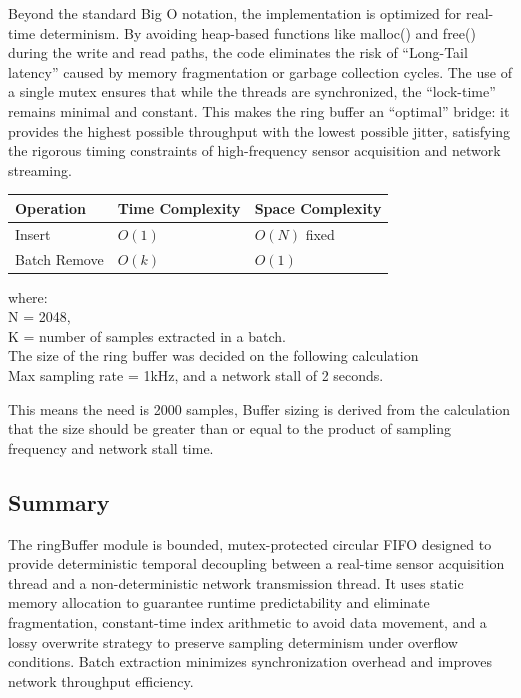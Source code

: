 Beyond the standard Big O notation, the implementation is optimized for real-time determinism. By avoiding heap-based functions like malloc() and free() during the write and read paths, the code eliminates the risk of “Long-Tail latency” caused by memory fragmentation or garbage collection cycles. The use of a single mutex ensures that while the threads are synchronized, the “lock-time” remains minimal and constant. This makes the ring buffer an “optimal” bridge: it provides the highest possible throughput with the lowest possible jitter, satisfying the rigorous timing constraints of high-frequency sensor acquisition and network streaming.

\begin{table}[H]
    \centering 
        \begin{tabular}{lll}
        \toprule
		\textbf{Operation} & \textbf{Time Complexity} & \textbf{Space Complexity} \\
		\midrule 
		Insert & $O(1)$ & $O(N)$ fixed \\
		Batch Remove &  $O(k)$ & $O(1)$ \\
        \bottomrule
    \end{tabular}
\end{table}

where: \\
N = 2048, \\
K = number of samples extracted in a batch. \\

The size of the ring buffer was decided on the following calculation\\
Max sampling rate = 1kHz, and a network stall of 2 seconds. 


This means the need is 2000 samples, Buffer sizing is derived from the calculation that the size should be greater than or equal to the product of sampling frequency and network stall time.


\subsection{Summary}
The ringBuffer module is bounded, mutex-protected circular FIFO designed to provide deterministic temporal decoupling between a real-time sensor acquisition thread and a non-deterministic network transmission thread. It uses static memory allocation to guarantee runtime predictability and eliminate fragmentation, constant-time index arithmetic to avoid data movement, and a lossy overwrite strategy to preserve sampling determinism under overflow conditions. Batch extraction minimizes synchronization overhead and improves network throughput efficiency.


